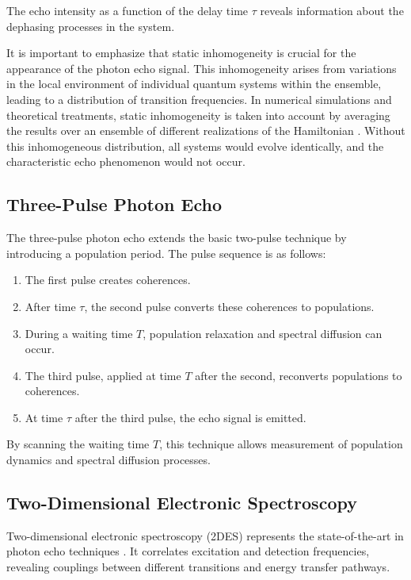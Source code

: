 \noindent The echo intensity as a function of the delay time $\tau$ reveals information about the dephasing processes in the system.

\noindent It is important to emphasize that static inhomogeneity is crucial for the appearance of the photon echo signal. This inhomogeneity arises from variations in the local environment of individual quantum systems within the ensemble, leading to a distribution of transition frequencies. In numerical simulations and theoretical treatments, static inhomogeneity is taken into account by averaging the results over an ensemble of different realizations of the Hamiltonian \cite{Cho2009TwodimensionalOpticalSpectroscopy, Mukamel1995PrinciplesNonlinearOptical}. Without this inhomogeneous distribution, all systems would evolve identically, and the characteristic echo phenomenon would not occur.

\subsection{Three-Pulse Photon Echo}
\label{subsec:three_pulse_echo}

\noindent The three-pulse photon echo extends the basic two-pulse technique by introducing a population period. The pulse sequence is as follows:

\begin{enumerate}
    \item The first pulse creates coherences.
    \item After time $\tau$, the second pulse converts these coherences to populations.
    \item During a waiting time $T$, population relaxation and spectral diffusion can occur.
    \item The third pulse, applied at time $T$ after the second, reconverts populations to coherences.
    \item At time $\tau$ after the third pulse, the echo signal is emitted.
\end{enumerate}

\noindent By scanning the waiting time $T$, this technique allows measurement of population dynamics and spectral diffusion processes.

\subsection{Two-Dimensional Electronic Spectroscopy}
\label{subsec:2d_spectroscopy}

\noindent Two-dimensional electronic spectroscopy (2DES) represents the state-of-the-art in photon echo techniques \cite{Jonas2003TwodimensionalFemtosecondSpectroscopy, BrixnerEtAl2004PhasestabilizedTwodimensionalElectronic, Schlau-CohenEtAl2011TwodimensionalElectronicSpectroscopy}. It correlates excitation and detection frequencies, revealing couplings between different transitions and energy transfer pathways.

